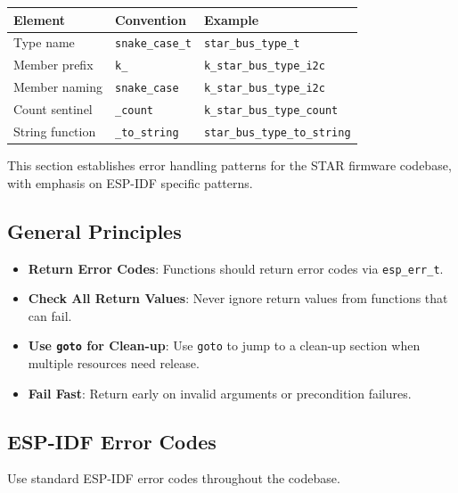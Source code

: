 \begin{center}
\begin{tabular}{|l|l|l|}
\hline
\textbf{Element} & \textbf{Convention} & \textbf{Example} \\
\hline
Type name & \texttt{snake\_case\_t} & \texttt{star\_bus\_type\_t} \\
\hline
Member prefix & \texttt{k\_} & \texttt{k\_star\_bus\_type\_i2c} \\
\hline
Member naming & \texttt{snake\_case} & \texttt{k\_star\_bus\_type\_i2c} \\
\hline
Count sentinel & \texttt{\_count} & \texttt{k\_star\_bus\_type\_count} \\
\hline
String function & \texttt{\_to\_string} & \texttt{star\_bus\_type\_to\_string} \\
\hline
\end{tabular}
\end{center}



This section establishes error handling patterns for the STAR firmware codebase, with emphasis on ESP-IDF specific patterns.

\subsection{General Principles}

\begin{itemize}
    \item \textbf{Return Error Codes}: Functions should return error codes via \texttt{esp\_err\_t}.
    \item \textbf{Check All Return Values}: Never ignore return values from functions that can fail.
    \item \textbf{Use \texttt{goto} for Clean-up}: Use \texttt{goto} to jump to a clean-up section when multiple resources need release.
    \item \textbf{Fail Fast}: Return early on invalid arguments or precondition failures.
\end{itemize}

\subsection{ESP-IDF Error Codes}

Use standard ESP-IDF error codes throughout the codebase.

